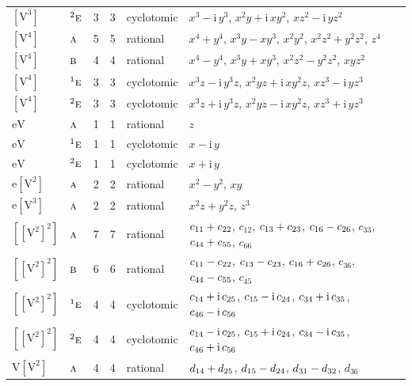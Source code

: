 \documentclass[10pt,a4paper]{article}
\numberwithin{equation}{section}
\newcommand{\irr}[1]{\text{\normalfont\scshape #1}}
\newcommand{\conjpair}[1]{{}^{#1}}
\newcommand{\iunit}{\mathrm{i}}
\newcommand{\jahn}[1]{\mathrm{#1}}
\newlength{\fillwidth}\newlength{\cellwidth}\newlength{\colwidth}
\newcommand{\signbreak}{\penalty100\relax}
\begin{document}
{\begin{longtable}{@{}llrrl>{\RaggedRight\arraybackslash}p{\fillwidth}@{}}
$\jahn{[V^{3}]}$ & $\conjpair{2}\irr{e}$ & 3 & 3 & cyclotomic & $x^{3} - \iunit{}\,y^{3}$, $x^{2}y + \iunit{}\,xy^{2}$, $xz^{2} - \iunit{}\,yz^{2}$\\
$\jahn{[V^{4}]}$ & $\irr{a}$ & 5 & 5 & rational & $x^{4} + y^{4}$, $x^{3}y - xy^{3}$, $x^{2}y^{2}$, $x^{2}z^{2} + y^{2}z^{2}$, $z^{4}$\\
$\jahn{[V^{4}]}$ & $\irr{b}$ & 4 & 4 & rational & $x^{4} - y^{4}$, $x^{3}y + xy^{3}$, $x^{2}z^{2} - y^{2}z^{2}$, $xyz^{2}$\\
$\jahn{[V^{4}]}$ & $\conjpair{1}\irr{e}$ & 3 & 3 & cyclotomic & $x^{3}z - \iunit{}\,y^{3}z$, $x^{2}yz + \iunit{}\,xy^{2}z$, $xz^{3} - \iunit{}\,yz^{3}$\\
$\jahn{[V^{4}]}$ & $\conjpair{2}\irr{e}$ & 3 & 3 & cyclotomic & $x^{3}z + \iunit{}\,y^{3}z$, $x^{2}yz - \iunit{}\,xy^{2}z$, $xz^{3} + \iunit{}\,yz^{3}$\\
$\jahn{eV}$ & $\irr{a}$ & 1 & 1 & rational & $z$\\
$\jahn{eV}$ & $\conjpair{1}\irr{e}$ & 1 & 1 & cyclotomic & $x - \iunit{}\,y$\\
$\jahn{eV}$ & $\conjpair{2}\irr{e}$ & 1 & 1 & cyclotomic & $x + \iunit{}\,y$\\
$\jahn{e[V^{2}]}$ & $\irr{a}$ & 2 & 2 & rational & $x^{2} - y^{2}$, $xy$\\
$\jahn{e[V^{3}]}$ & $\irr{a}$ & 2 & 2 & rational & $x^{2}z + y^{2}z$, $z^{3}$\\
$\jahn{[[V^{2}]^{2}]}$ & $\irr{a}$ & 7 & 7 & rational & $c_{11} +\signbreak c_{22}$, $c_{12}$, $c_{13} +\signbreak c_{23}$, $c_{16} -\signbreak c_{26}$, $c_{33}$, $c_{44} +\signbreak c_{55}$, $c_{66}$\\
$\jahn{[[V^{2}]^{2}]}$ & $\irr{b}$ & 6 & 6 & rational & $c_{11} -\signbreak c_{22}$, $c_{13} -\signbreak c_{23}$, $c_{16} +\signbreak c_{26}$, $c_{36}$, $c_{44} -\signbreak c_{55}$, $c_{45}$\\
$\jahn{[[V^{2}]^{2}]}$ & $\conjpair{1}\irr{e}$ & 4 & 4 & cyclotomic & $c_{14} +\signbreak \iunit{}\,c_{25}$, $c_{15} -\signbreak \iunit{}\,c_{24}$, $c_{34} +\signbreak \iunit{}\,c_{35}$, $c_{46} -\signbreak \iunit{}\,c_{56}$\\
$\jahn{[[V^{2}]^{2}]}$ & $\conjpair{2}\irr{e}$ & 4 & 4 & cyclotomic & $c_{14} -\signbreak \iunit{}\,c_{25}$, $c_{15} +\signbreak \iunit{}\,c_{24}$, $c_{34} -\signbreak \iunit{}\,c_{35}$, $c_{46} +\signbreak \iunit{}\,c_{56}$\\
$\jahn{V[V^{2}]}$ & $\irr{a}$ & 4 & 4 & rational & $d_{14} +\signbreak d_{25}$, $d_{15} -\signbreak d_{24}$, $d_{31} -\signbreak d_{32}$, $d_{36}$\\

\end{longtable}}
\end{document}
